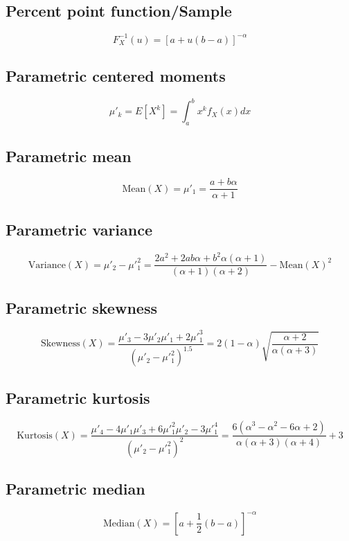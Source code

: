 \documentclass{article}
\begin{document}
\subsection{Percent point function/Sample}
\begin{equation*} F^{-1}_{X}\left(u\right)=\left[a+u(b-a)\right]^{-\alpha} \end{equation*}
\subsection{Parametric centered moments}
\begin{equation*} \mu'_{k}=E[X^k]=\int_{a}^{b}x^{k}f_{X}\left(x\right)dx \end{equation*}
\subsection{Parametric mean}
\begin{equation*} \mathrm{Mean}(X)=\mu'_{1}=\frac{a+b\alpha}{\alpha+1} \end{equation*}
\subsection{Parametric variance}
\begin{equation*} \mathrm{Variance}(X)=\mu'_{2}-\mu'^{2}_{1}=\frac{2a^2+2ab\alpha+b^2\alpha(\alpha+1)}{(\alpha+1)(\alpha+2)}-\mathrm{Mean}(X)^{2} \end{equation*}
\subsection{Parametric skewness}
\begin{equation*} \mathrm{Skewness}(X)=\frac{\mu'_{3}-3\mu'_{2}\mu'_{1}+2\mu'^{3}_{1}}{(\mu'_{2}-\mu'^{2}_{1})^{1.5}}=2\left(1-\alpha\right)\sqrt{\frac{\alpha+2}{\alpha\left(\alpha+3\right)}} \end{equation*}
\subsection{Parametric kurtosis}
\begin{equation*} \mathrm{Kurtosis}(X)=\frac{\mu'_{4}-4\mu'_{1}\mu'_{3}+6\mu'^{2}_{1}\mu'_{2}-3\mu'^{4}_{1}}{(\mu'_{2}-\mu'^{2}_{1})^{2}}=\frac{6\left(\alpha^{3}-\alpha^{2}-6\alpha+2\right)}{\alpha\left(\alpha+3\right)\left(\alpha+4\right)}+3 \end{equation*}
\subsection{Parametric median}
\begin{equation*} \mathrm{Median}(X)=\left[a+\frac{1}{2}(b-a)\right]^{-\alpha} \end{equation*}
\end{document}
